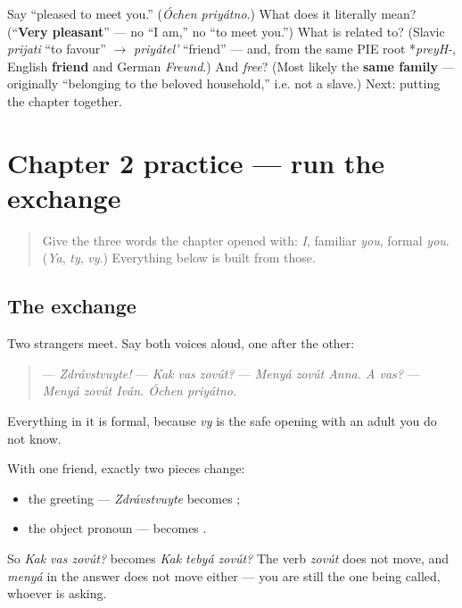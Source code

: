 \begin{tcolorbox}[breakable,colback=teal!4,colframe=teal!35!black,title={Before you move on}]
Say \textquotedblleft{}pleased to meet you.\textquotedblright{} (\emph{Óchen priyátno}.) What does it literally mean? (\textquotedblleft{}\textbf{Very pleasant}\textquotedblright{} — no \textquotedblleft{}I am,\textquotedblright{} no \textquotedblleft{}to meet you.\textquotedblright{}) What is \emph{} related to? (Slavic \emph{prijati} \textquotedblleft{}to favour\textquotedblright{} $\to$ \emph{priyátel'} \textquotedblleft{}friend\textquotedblright{} — and, from the same PIE root *\emph{preyH-}, English \textbf{friend} and German \emph{Freund}.) And \emph{free}? (Most likely the \textbf{same family} — originally \textquotedblleft{}belonging to the beloved household,\textquotedblright{} i.e. not a slave.) Next: putting the chapter together.
\end{tcolorbox}
\section[Practice]{Chapter 2 practice — run the exchange}

\label{lesson:RU-C02-practice}



\begin{quote}
Give the three words the chapter opened with: \emph{I}, familiar \emph{you}, formal \emph{you}. (\emph{Ya}, \emph{ty}, \emph{vy}.) Everything below is built from those.
\end{quote}

\subsection*{The exchange}
Two strangers meet. Say both voices aloud, one after the other:

\begin{quote}
— \emph{Zdrávstvuyte!} — \emph{Kak vas zovút?} — \emph{Menyá zovút Anna. A vas?} — \emph{Menyá zovút Iván. Óchen priyátno.}
\end{quote}

Everything in it is formal, because \emph{vy} is the safe opening with an adult you do not know.

\begin{grammarlens}[title={Grammar Lens: what moves when the exchange goes informal}]
With one friend, exactly two pieces change:

\begin{itemize}
\raggedright
  \item the greeting — \emph{Zdrávstvuyte} becomes \textbf{};
  \item the object pronoun — \textbf{} becomes \textbf{}.
\end{itemize}

So \emph{Kak vas zovút?} becomes \emph{Kak tebyá zovút?} The verb \emph{zovút} does not move, and \emph{menyá} in the answer does not move either — you are still the one being called, whoever is asking.
\end{grammarlens}

